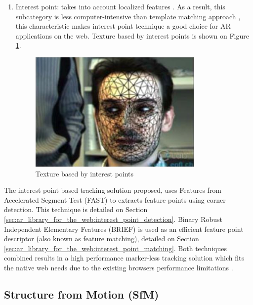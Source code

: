 \begin{enumerate}
\begin{enumerate}
      \item Interest point: takes into account localized features \cite{Teichrieb2007}. As a result, this subcategory is less computer-intensive than template matching approach \cite{Teichrieb2007,RostenFaster2010}, this characteristic makes interest point technique a good choice for AR applications on the web. Texture based by interest points is shown on Figure \ref{figure:keypoints}.

        \begin{figure}[!htb]
          \centering
          \includegraphics[width=240pt]{chapters/basic_concepts/keypoints.png}
          \caption{Texture based by interest points}
          \label{figure:keypoints}
        \end{figure}
    \end{enumerate}

\end{enumerate}

The interest point based tracking solution proposed, uses Features from Accelerated Segment Test (FAST) \cite{Rosten2010} to extracts feature points using corner detection. This technique is detailed on Section \ref{sec:ar_library_for_the_web:interest_point_detection}. Binary Robust Independent Elementary Features (BRIEF) \cite{Calonder2010} is used as an efficient feature point descriptor (also known as feature matching), detailed on Section \ref{sec:ar_library_for_the_web:interest_point_matching}. Both techniques combined results in a high performance marker-less tracking solution which fits the native web needs due to the existing browsers performance limitations \cite{Calonder2010,RostenFaster2010}.


\subsection{Structure from Motion (SfM)} %
\label{sub:basic_concepts:markerless_tracking_technique:sfm}

